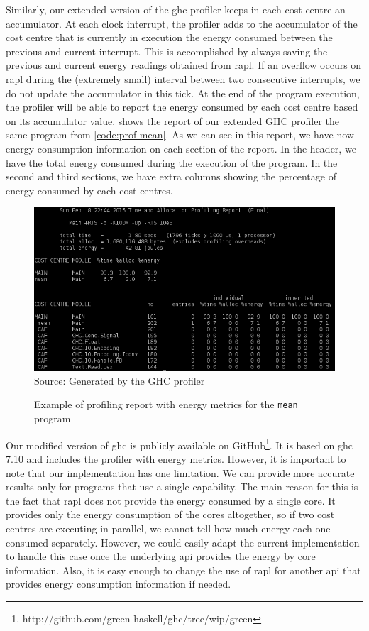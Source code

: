 Similarly, our extended version of the \ac{ghc} profiler keeps in each cost centre an accumulator. At each clock interrupt, the profiler adds to the accumulator of the cost centre that is currently in execution the energy consumed between the previous and current interrupt. This is accomplished by always saving the previous and current energy readings obtained from \ac{rapl}. If an overflow occurs on \ac{rapl} during the (extremely small) interval between two consecutive interrupts, we do not update the accumulator in this tick. At the end of the program execution, the profiler will be able to report the energy consumed by each cost centre based on its accumulator value.  shows the report of our extended GHC profiler the same program from \autoref{code:prof-mean}. As we can see in this report, we have now energy consumption information on each section of the report. In the header, we have the total energy consumed during the execution of the program. In the second and third sections, we have extra columns showing the percentage of energy consumed by each cost centres.

\begin{figure}[htp]
  \centering
  \caption{Example of profiling report with energy metrics for the \texttt{mean} program}
  \includegraphics[width=\columnwidth]{images/energy-profiler-placeholder}
  \footnotesize{Source: Generated by the GHC profiler}
  \label{fig:energy-prof-report}
\end{figure}

Our modified version of \ac{ghc} is publicly available on GitHub\footnote{http://github.com/green-haskell/ghc/tree/wip/green}. It is based on \ac{ghc} 7.10 and includes the profiler with energy metrics. However, it is important to note that our implementation has one limitation. We can provide more accurate results only for programs that use a single capability. The main reason for this is the fact that \ac{rapl} does not provide the energy consumed by a single core. It provides only the energy consumption of the cores altogether, so if two cost centres are executing in parallel, we cannot tell how much energy each one consumed separately. However, we could easily adapt the current implementation to handle this case once the underlying \ac{api} provides the energy by core information. Also, it is easy enough to change the use of \ac{rapl} for another \ac{api} that provides energy consumption information if needed.

